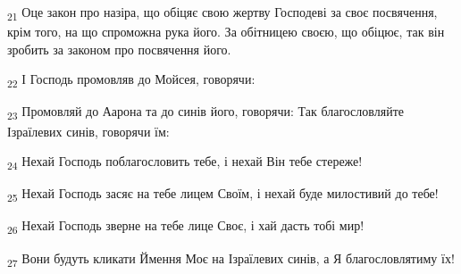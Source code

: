 \begin{tcolorbox}
\textsubscript{21} Оце закон про назіра, що обіцяє свою жертву Господеві за своє посвячення, крім того, на що спроможна рука його. За обітницею своєю, що обіцює, так він зробить за законом про посвячення його.
\end{tcolorbox}
\begin{tcolorbox}
\textsubscript{22} І Господь промовляв до Мойсея, говорячи:
\end{tcolorbox}
\begin{tcolorbox}
\textsubscript{23} Промовляй до Аарона та до синів його, говорячи: Так благословляйте Ізраїлевих синів, говорячи їм:
\end{tcolorbox}
\begin{tcolorbox}
\textsubscript{24} Нехай Господь поблагословить тебе, і нехай Він тебе стереже!
\end{tcolorbox}
\begin{tcolorbox}
\textsubscript{25} Нехай Господь засяє на тебе лицем Своїм, і нехай буде милостивий до тебе!
\end{tcolorbox}
\begin{tcolorbox}
\textsubscript{26} Нехай Господь зверне на тебе лице Своє, і хай дасть тобі мир!
\end{tcolorbox}
\begin{tcolorbox}
\textsubscript{27} Вони будуть кликати Ймення Моє на Ізраїлевих синів, а Я благословлятиму їх!
\end{tcolorbox}

